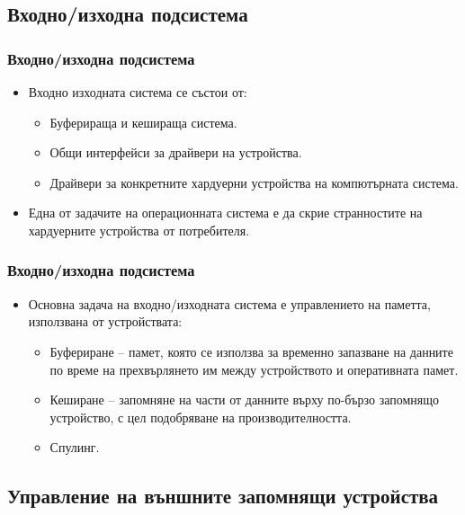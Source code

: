\documentclass[ignorenonframetext, hyperref=unicode]{beamer}
\begin{document}
\subsection{Входно/изходна подсистема}

\begin{frame}
\frametitle{Входно/изходна подсистема}
\begin{itemize}
\item Входно изходната система се състои от:
\begin{itemize}
  \item Буферираща и кешираща система.
  \item Общи интерфейси за драйвери на устройства.
  \item Драйвери за конкретните хардуерни устройства на компютърната система.
\end{itemize}
\item Една от задачите на операционната система е да скрие странностите на
хардуерните устройства от потребителя.
\end{itemize}
\end{frame}

\begin{frame}
\frametitle{Входно/изходна подсистема}
\begin{itemize}
\item Основна задача на входно/изходната система е управлението на паметта,
използвана от устройствата:
  \begin{itemize}
    \item Буфериране -- памет, която се използва за временно запазване на
    данните по време на прехвърлянето им между устройството и оперативната
    памет.
    \item Кеширане -- запомняне на части от данните върху по-бързо запомнящо
    устройство, с цел подобряване на производителността.
    \item Спулинг. 
  \end{itemize}
\end{itemize}
\end{frame}

\subsection{Управление на външните запомнящи устройства}
\end{document}
